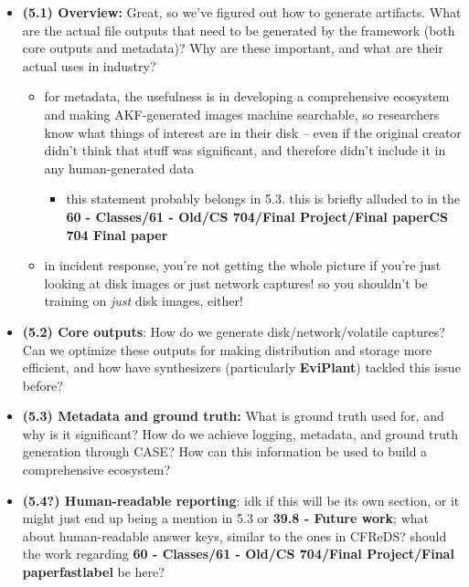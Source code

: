 \begin{itemize}
\tightlist
\item
  \textbf{(5.1) Overview:} Great, so we've figured out how to generate
  artifacts. What are the actual file outputs that need to be generated
  by the framework (both core outputs and metadata)? Why are these
  important, and what are their actual uses in industry?

  \begin{itemize}
  \tightlist
  \item
    for metadata, the usefulness is in developing a comprehensive
    ecosystem and making AKF-generated images machine searchable, so
    researchers know what things of interest are in their disk -- even
    if the original creator didn't think that stuff was significant, and
    therefore didn't include it in any human-generated data

    \begin{itemize}
    \tightlist
    \item
      this statement probably belongs in 5.3. this is briefly alluded to
      in the \textbf{60 - Classes/61 - Old/CS 704/Final Project/Final
      paper\textbar CS 704 Final paper}
    \end{itemize}
  \item
    in incident response, you're not getting the whole picture if you're
    just looking at disk images or just network captures! so you
    shouldn't be training on \emph{just} disk images, either!
  \end{itemize}
\item
  \textbf{(5.2) Core outputs}: How do we generate disk/network/volatile
  captures? Can we optimize these outputs for making distribution and
  storage more efficient, and how have synthesizers (particularly
  \textbf{EviPlant}) tackled this issue before?
\item
  \textbf{(5.3) Metadata and ground truth:} What is ground truth used
  for, and why is it significant? How do we achieve logging, metadata,
  and ground truth generation through CASE? How can this information be
  used to build a comprehensive ecosystem?
\item
  \textbf{(5.4?) Human-readable reporting}: idk if this will be its own
  section, or it might just end up being a mention in 5.3 or
  \textbf{39.8 - Future work}; what about human-readable answer keys,
  similar to the ones in CFReDS? should the work regarding \textbf{60 -
  Classes/61 - Old/CS 704/Final Project/Final paper\textbar fastlabel}
  be here?
\end{itemize}

